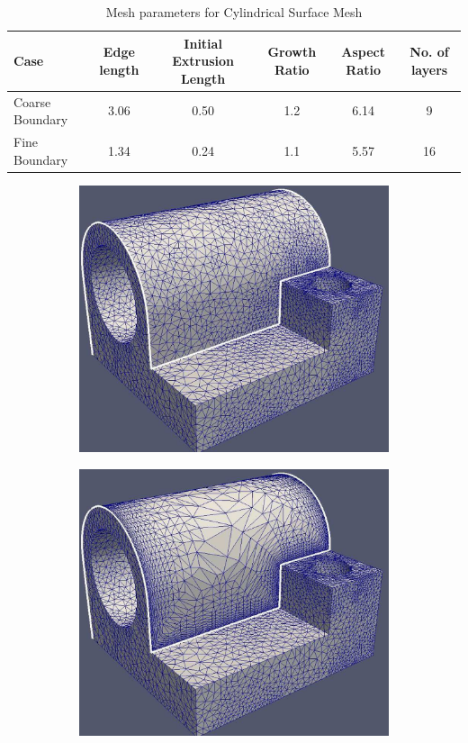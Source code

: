 \documentclass[conf]{new-aiaa}
\begin{document}
\begin{table}
\caption{\label{cyl-table} Mesh parameters for Cylindrical Surface Mesh}
\centering
\begin{tabular}{lccccc}
\hline
Case& Edge length& Initial Extrusion Length & Growth Ratio & Aspect Ratio & No. of layers\\\hline
Coarse Boundary& 3.06 & 0.50 & 1.2 & 6.14 & 9\\
Fine Boundary& 1.34 & 0.24 & 1.1 & 5.57 & 16\\
\hline
\end{tabular}
\end{table}

\begin{figure}[hbt!]
\centering
\begin{subfigure}{.5\textwidth}
  \centering
  \includegraphics[width=.9\linewidth]{joint-surf5/before1.eps}
  \caption{}
  \label{surf5-joint-view1}
\end{subfigure}%
\begin{subfigure}{.5\textwidth}
  \centering
  \includegraphics[width=.9\linewidth]{joint-surf5/after1.eps}

\end{subfigure}
\end{figure}
\end{document}
